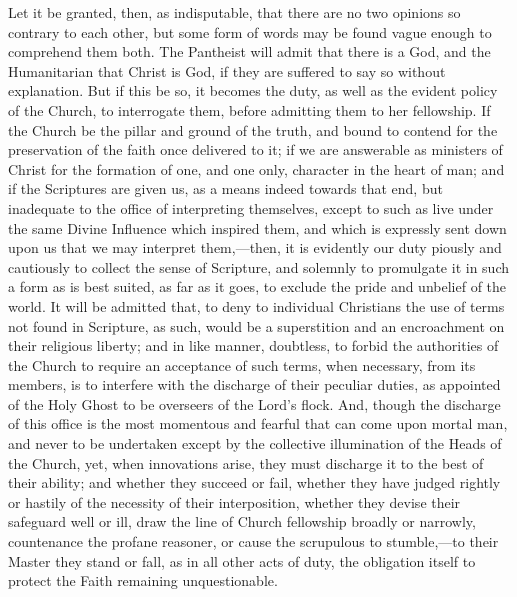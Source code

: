 Let it be granted, then, as indisputable, that there are no two
opinions so contrary to each other, but some form of words may be
found vague enough to comprehend them both. The Pantheist will admit
that there is a God, and the Humanitarian that Christ is God, if they
are suffered to say so without explanation. But if this be so, it
becomes the duty, as well as the evident policy of the Church, to
interrogate them, before admitting them to her fellowship. If the
Church be the pillar and ground of the truth, and bound to contend for
the preservation of the faith once delivered to it; if we are
answerable as ministers of Christ for the formation of one, and one
only, character in the heart of man; and if the Scriptures are given
us, as a means indeed towards that end, but inadequate to the office
of interpreting themselves, except to such as live under the same
Divine Influence which inspired them, and which is expressly sent down
upon us that we may interpret them,—then, it is evidently our duty
piously and cautiously to collect the sense of Scripture, and solemnly
to promulgate it in such a form as is best suited, as far as it goes,
to exclude the pride and unbelief of the world. It will be admitted
that, to deny to individual Christians the use of terms not
found in Scripture, as such, would be a superstition and an
encroachment on their religious liberty; and in like manner,
doubtless, to forbid the authorities of the Church to require an
acceptance of such terms, when necessary, from its members, is to
interfere with the discharge of their peculiar duties, as appointed of
the Holy Ghost to be overseers of the Lord's flock. And, though the
discharge of this office is the most momentous and fearful that can
come upon mortal man, and never to be undertaken except by the
collective illumination of the Heads of the Church, yet, when
innovations arise, they must discharge it to the best of their
ability; and whether they succeed or fail, whether they have judged
rightly or hastily of the necessity of their interposition, whether
they devise their safeguard well or ill, draw the line of Church
fellowship broadly or narrowly, countenance the profane reasoner, or
cause the scrupulous to stumble,—to their Master they stand or fall,
as in all other acts of duty, the obligation itself to protect the
Faith remaining unquestionable.

